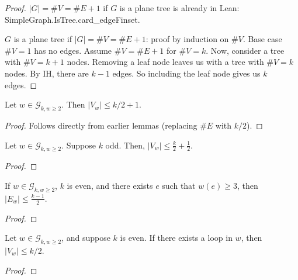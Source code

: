 \begin{proof}
  \notready
  $|G|=\#V=\#E+1$ if $G$ is a plane tree is already in Lean: SimpleGraph.IsTree.card\_edgeFinset.

  $G$ is a plane tree if $|G|=\#V=\#E+1$: proof by induction on $\#V$. Base case $\#V = 1$ has no edges.
  Assume $\#V = \#E + 1$ for $\#V = k$. Now, consider a tree with $\#V = k+1$ nodes. Removing a leaf
  node leaves us with a tree with $\#V = k$ nodes. By IH, there are $k - 1$ edges. So including the
  leaf node gives us $k$ edges.
\end{proof}


\begin{lemma}
  \label{lem:vertex_bound}
  Let $w \in \mathcal{G}_{k,w \geq 2}$. Then $|V_w| \le k/2 + 1$.
\end{lemma}

\begin{proof}
  Follows directly from earlier lemmas (replacing $\#E$ with $k/2$).
\end{proof}


\begin{lemma}
  \label{lem:odd_vertex_bound}
  Let $w \in \mathcal{G}_{k,w \geq 2}$.
  Suppose $k$ odd. Then, $|V_w| \le \frac{k}{2} + \frac{1}{2}$.
\end{lemma}

\begin{proof}
\end{proof}


\begin{lemma}
  \label{lem:edge_bound_large_w}
  If $w \in \mathcal{G}_{k,w \geq 2}$, $k$ is even, and there exists $e$ such that $w(e) \ge 3$,
  then $|E_w| \le \frac{k-1}{2}$.
\end{lemma}

\begin{proof}
\end{proof}


\begin{proposition}%
  \label{prop:g_bound_self_edge}
  Let $w\in\mathcal{G}_{k,w \geq 2}$, and suppose $k$ is even. If there exists a loop in $w$,
  then $|V_w|\le k/2$.
\end{proposition}

\begin{proof}

\end{proof}


